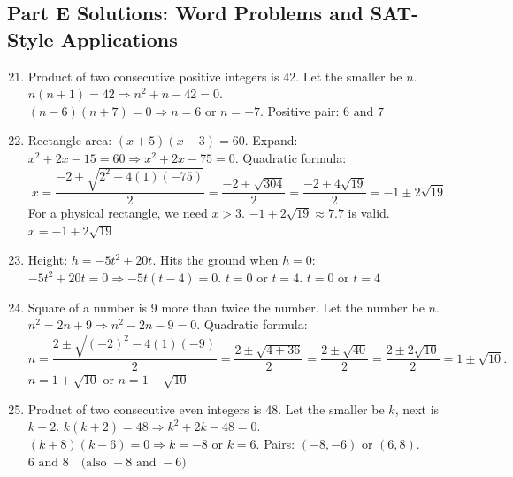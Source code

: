 \documentclass[14pt]{extarticle}
\begin{document}
\subsection*{Part E Solutions: Word Problems and SAT-Style Applications}
\begin{enumerate}
  \setcounter{enumi}{20}
  \item Product of two consecutive positive integers is 42.  
  Let the smaller be \(n\).  
  \(n(n+1) = 42 \Rightarrow n^2 + n - 42 = 0.\)  
  \((n - 6)(n + 7) = 0 \Rightarrow n = 6 \text{ or } n = -7.\)  
  Positive pair: \(\boxed{6 \text{ and } 7}\)

  \item Rectangle area: \((x + 5)(x - 3) = 60.\)  
  Expand: \(x^2 + 2x - 15 = 60 \Rightarrow x^2 + 2x - 75 = 0.\)  
  Quadratic formula:
  \[
  x = \frac{-2 \pm \sqrt{2^2 - 4(1)(-75)}}{2}
  = \frac{-2 \pm \sqrt{304}}{2}
  = \frac{-2 \pm 4\sqrt{19}}{2}
  = -1 \pm 2\sqrt{19}.
  \]
  For a physical rectangle, we need \(x > 3\).  
  \(-1 + 2\sqrt{19} \approx 7.7\) is valid.  
  \(\boxed{x = -1 + 2\sqrt{19}}\)

  \item Height: \(h = -5t^2 + 20t.\)  
  Hits the ground when \(h = 0\):  
  \(-5t^2 + 20t = 0 \Rightarrow -5t(t - 4) = 0.\)  
  \(t = 0\) or \(t = 4.\)  
  \(\boxed{t = 0 \text{ or } t = 4}\)

  \item Square of a number is 9 more than twice the number.  
  Let the number be \(n\).  
  \(n^2 = 2n + 9 \Rightarrow n^2 - 2n - 9 = 0.\)  
  Quadratic formula:
  \[
  n = \frac{2 \pm \sqrt{(-2)^2 - 4(1)(-9)}}{2}
  = \frac{2 \pm \sqrt{4 + 36}}{2}
  = \frac{2 \pm \sqrt{40}}{2}
  = \frac{2 \pm 2\sqrt{10}}{2}
  = 1 \pm \sqrt{10}.
  \]
  \(\boxed{n = 1 + \sqrt{10} \text{ or } n = 1 - \sqrt{10}}\)

  \item Product of two consecutive even integers is 48.  
  Let the smaller be \(k\), next is \(k + 2.\)  
  \(k(k+2) = 48 \Rightarrow k^2 + 2k - 48 = 0.\)  
  \((k + 8)(k - 6) = 0 \Rightarrow k = -8 \text{ or } k = 6.\)  
  Pairs: \((-8, -6)\) or \((6, 8).\)  
  \(\boxed{6 \text{ and } 8 \quad \text{(also } -8 \text{ and } -6\text{)}}\)
\end{enumerate}






\end{document}
